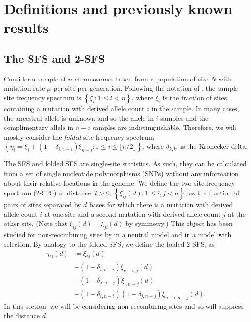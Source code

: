 \documentclass[11pt, letterpaper]{article}   	%
\newcommand{\floor}[1]{\lfloor #1 \rfloor}
\begin{document}
\section*{Definitions and previously known results}

\subsection*{The SFS and 2-SFS}
Consider a sample of $n$ chromosomes taken from a population of size $N$ with mutation rate $\mu$ per site per generation.
Following the notation of \cite{Fu1995}, the sample site frequency spectrum is $\left\{ \xi_i : 1 \leq i < n \right\}$, where $\xi_i$ is the fraction of sites containing a mutation with derived allele count $i$ in the sample.
In many cases, the ancestral allele is unknown and so the allele in $i$ samples and the complimentary allele in $n-i$ samples are indistinguishable.
Therefore, we will mostly consider the \textit{folded} site frequency spectrum $\left\{ \eta_i = \xi_i + (1-\delta_{i,n-i}) \xi_{n-i}: 1 \leq i \leq \floor{n/2} \right\}$, where $\delta_{k,k'}$ is the Kronecker delta. %

The SFS and folded SFS are single-site statistics.
As such, they can be calculated from a set of single nucleotide polymorphisms (SNPs) without any information about their relative locations in the genome.
We define the two-site frequency spectrum (2-SFS) at distance $d > 0$,
$\left\{ \xi_{ij}(d) : 1 \leq i, j < n\right\}$,
as the fraction of pairs of sites separated by $d$ bases for which there is a mutation with derived allele count $i$ at one site and a second mutation with derived allele count $j$ at the other site.
(Note that $\xi_{ij}(d) = \xi_{ji}(d)$ by symmetry.)
This object has been studied for non-recombining sites by \cite{FerrettiEtAl2018} in a neutral model and \cite{Xie2011} in a model with selection.
By analogy to the folded SFS, we define the folded 2-SFS, as
\begin{align*}
    \eta_{ij}(d) &= \xi_{ij}(d) \\
                 &+ (1-\delta_{i,n-i}) \xi_{n-i,j}(d) \\
                 &+ (1-\delta_{j,n-j}) \xi_{i,n-j}(d) \\
                 &+ (1-\delta_{i,n-i}) (1-\delta_{j,n-j}) \xi_{n-i,n-j}(d).
\end{align*}
In this section, we will be considering non-recombining sites and so will suppress the distance $d$.
\end{document}
